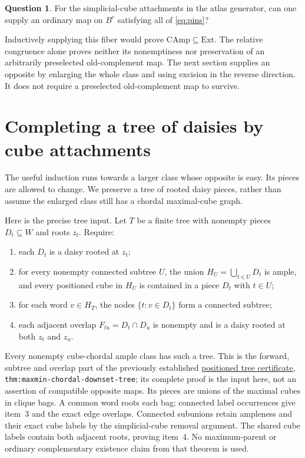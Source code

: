 \documentclass[11pt]{article}
\theoremstyle{definition}
\newtheorem{question}[theorem]{Question}
\begin{document}
\begin{question}\label{qu:supply}
For the simplicial-cube attachments in the atlas generator, can one
supply an ordinary map on $B^c$ satisfying all of \eqref{eq:pins}?
\end{question}
Inductively supplying this fiber would prove $\mathrm{CAmp}\subseteq\mathrm{Ext}$.
The relative congruence alone proves neither its nonemptiness nor preservation
of an arbitrarily preselected old-complement map. The next section supplies
an opposite by enlarging the whole class and using excision in the reverse
direction. It does not require a preselected old-complement map to survive.

\section{Completing a tree of daisies by cube attachments}
\label{sec:tree-completion}
The useful induction runs towards a larger class whose opposite is easy.
Its pieces are allowed to change. We preserve a tree of rooted daisy
pieces, rather than assume the enlarged class still has a chordal
maximal-cube graph.

Here is the precise tree input. Let $T$ be a finite tree with nonempty
pieces $D_t\subseteq W$ and roots $z_t$. Require:
\begin{enumerate}
\item each $D_t$ is a daisy rooted at $z_t$;
\item for every nonempty connected subtree $U$, the union
      $H_U=\bigcup_{t\in U}D_t$ is ample, and every positioned cube in
      $H_U$ is contained in a piece $D_t$ with $t\in U$;
\item for each word $v\in H_T$, the nodes $\{t:v\in D_t\}$ form
      a connected subtree;
\item each adjacent overlap $F_{tu}=D_t\cap D_u$ is nonempty and
      is a daisy rooted at both $z_t$ and $z_u$.
\end{enumerate}
Every nonempty cube-chordal ample class has such a tree. This is the
forward, subtree and overlap part of the previously established
\href{../../maxmin-forbidden/sections/chordal_downset_tree.tex}
{positioned tree certificate},
\texttt{thm:maxmin-chordal-downset-tree}; its complete proof is the
input here, not an assertion of compatible opposite maps. Its pieces
are unions of the maximal cubes in clique bags. A common word roots
each bag; connected label occurrences give item~3 and the exact edge
overlaps. Connected subunions retain ampleness and their exact cube
labels by the simplicial-cube removal argument. The shared cube labels
contain both adjacent roots, proving item~4. No maximum-parent or
ordinary complementary existence claim from that theorem is used.
\end{document}
